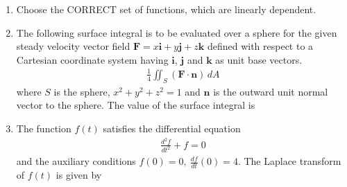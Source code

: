 \documentclass[journal]{IEEEtran}
\begin{document}
\begin{enumerate}[leftmargin=0pt]
\item Choose the CORRECT set of functions, which are linearly dependent.
\begin{enumerate}
\end{enumerate}
\hfill{}

\item The following surface integral is to be evaluated over a sphere for the given steady velocity vector field $\mathbf{F} = x \mathbf{i} + y \mathbf{j} + z \mathbf{k}$ defined with respect to a Cartesian coordinate system having $\mathbf{i}$, $\mathbf{j}$ and $\mathbf{k}$ as unit base vectors.
\begin{align*}
\frac14 \iint_S (\mathbf{F} \cdot \mathbf{n}) \, dA
\end{align*}
where $S$ is the sphere, $x^2 + y^2 + z^2 = 1$ and $\mathbf{n}$ is the outward unit normal vector to the sphere. The value of the surface integral is
\begin{enumerate}
\end{enumerate}
\hfill{}

\item The function $f(t)$ satisfies the differential equation
\begin{align*}
\frac{d^2 f}{dt^2} + f = 0
\end{align*}
and the auxiliary conditions $f(0) = 0,\ \frac{df}{dt}(0) = 4$. The Laplace transform of $f(t)$ is given by
\begin{enumerate}
\end{enumerate}
\hfill{}


\end{enumerate}
\end{document}
